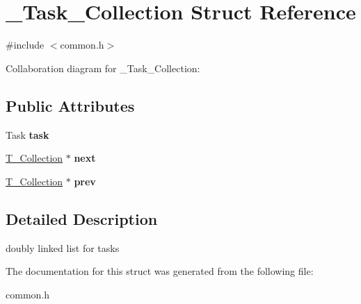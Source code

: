 \hypertarget{struct__Task__Collection}{}\section{\+\_\+\+Task\+\_\+\+Collection Struct Reference}
\label{struct__Task__Collection}


{\ttfamily \#include $<$common.\+h$>$}



Collaboration diagram for \+\_\+\+Task\+\_\+\+Collection\+:
\subsection*{Public Attributes}
\begin{DoxyCompactItemize}
\item 
Task {\bfseries task}\hypertarget{struct__Task__Collection_ab432a572c063b2d92dac9cc5d7c62da1}{}\label{struct__Task__Collection_ab432a572c063b2d92dac9cc5d7c62da1}

\item 
\hyperlink{struct__Task__Collection}{T\+\_\+\+Collection} $\ast$ {\bfseries next}\hypertarget{struct__Task__Collection_ac2fa2c57ac1d0918928eeca5e91bea74}{}\label{struct__Task__Collection_ac2fa2c57ac1d0918928eeca5e91bea74}

\item 
\hyperlink{struct__Task__Collection}{T\+\_\+\+Collection} $\ast$ {\bfseries prev}\hypertarget{struct__Task__Collection_aa4fe70ce664824c07f75b0bb49d52546}{}\label{struct__Task__Collection_aa4fe70ce664824c07f75b0bb49d52546}

\end{DoxyCompactItemize}


\subsection{Detailed Description}
doubly linked list for tasks 

The documentation for this struct was generated from the following file\+:\begin{DoxyCompactItemize}
\item 
common.\+h\end{DoxyCompactItemize}

